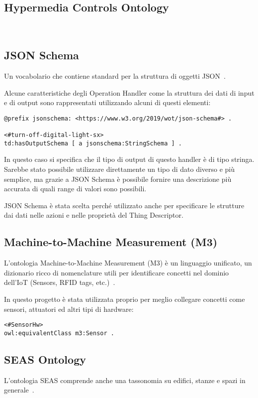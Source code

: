 \subsection{Hypermedia Controls Ontology}
~\cite{Hypermed84:online}
\subsection{JSON Schema}
Un vocabolario che contiene standard per la struttura di oggetti JSON~\cite{JSONSche6:online}.

\noindent Alcune caratteristiche degli Operation Handler come la struttura dei dati di input e di output sono rappresentati utilizzando alcuni di questi elementi:
\begin{verbatim}
@prefix jsonschema: <https://www.w3.org/2019/wot/json-schema#> .

<#turn-off-digital-light-sx>
td:hasOutputSchema [ a jsonschema:StringSchema ] .
\end{verbatim}
\noindent In questo caso si specifica che il tipo di output di questo handler è di tipo stringa. Sarebbe stato possibile utilizzare direttamente un tipo di dato diverso e più semplice, ma grazie a JSON Schema è possibile fornire una descrizione più accurata di quali range di valori sono possibili.

\noindent JSON Schema è stata scelta perché utilizzato anche per specificare le strutture dai dati nelle azioni e nelle proprietà del Thing Descriptor.


\subsection{Machine-to-Machine Measurement (M3)}
L'ontologia Machine-to-Machine Measurement (M3) è un linguaggio unificato, un dizionario ricco di nomenclature utili per identificare concetti nel dominio dell'IoT (Sensors, RFID tags, etc.)~\cite{SWoTSema18:online}.

\noindent In questo progetto è stata utilizzata proprio per meglio collegare concetti come sensori, attuatori ed altri tipi di hardware:

\begin{verbatim}
<#SensorHw>
owl:equivalentClass m3:Sensor .
\end{verbatim}

\subsection{SEAS Ontology}
L'ontologia SEAS comprende anche una tassonomia su edifici, stanze e spazi in generale~\cite{SEAS:online}.

